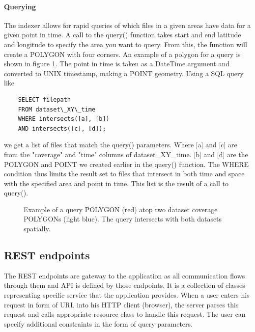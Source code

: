 \documentclass[11pt,a4paper,titlepage,oneside]{report}
\begin{document}
\paragraph{Querying}
The indexer allows for rapid queries of which files in a given areas have data for a given point in time. A call to the query() function takes start and end latitude and longitude to specify the area you want to query. From this, the function will create a POLYGON with four corners. An example of a polygon for a query is shown in figure \ref{fig:IndexerRequest}. The point in time is taken as a DateTime argument and converted to UNIX timestamp, making a POINT geometry. Using a SQL query like 
\begin{lstlisting}
    SELECT filepath
    FROM dataset\_XY\_time
    WHERE intersects([a], [b])
    AND intersects([c], [d]);
\end{lstlisting}
we get a list of files that match the query() parameters. Where [a] and [c] are from the "coverage" and "time" columns of dataset\_XY\_time. [b] and [d] are the POLYGON and POINT we created earlier in the query() function. The WHERE condition thus limits the result set to files that intersect in both time and space with the specified area and point in time. This list is the result of a call to query().

\begin{figure}[!htb]
\begin{center}
\caption{Example of a query POLYGON (red) atop two dataset coverage POLYGONs (light blue). The query intersects with both datasets spatially.}
\label{fig:IndexerRequest}
\end{center}
\end{figure}

\subsection{REST endpoints}
The REST endpoints are gateway to the application as all communication flows through them and \gls{API} is defined by those endpoints. It is a collection of classes representing specific service that the application provides. When a user enters his request in form of \gls{URL} into his \gls{HTTP} client (browser), the server parses this request and calls appropriate resource class to handle this request. The user can specify additional constraints in the form of query parameters.
\end{document}
